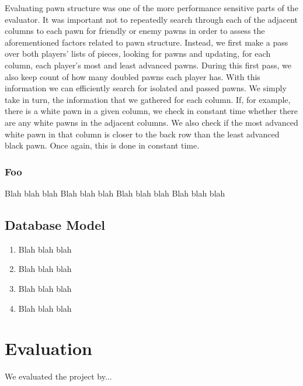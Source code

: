 \documentclass{l3proj}
\begin{document}
Evaluating pawn structure was one of the more performance sensitive parts of the evaluator. It was important not to repeatedly search through each of the adjacent columns to each pawn for friendly or enemy pawns in order to assess the aforementioned factors related to pawn structure. Instead, we first make a pass over both players’ lists of pieces, looking for pawns and updating, for each column, each player’s most and least advanced pawns. During this first pass, we also keep count of how many doubled pawns each player has. With this information we can efficiently search for isolated and passed pawns. We simply take in turn, the information that we gathered for each column. If, for example, there is a white pawn in a given column, we check in constant time whether there are any white pawns in the adjacent columns. We also check if the most advanced white pawn in that column is closer to the back row than the least advanced black pawn. Once again, this is done in constant time. \\

\subsection{Foo}

Blah blah blah
Blah blah blah
Blah blah blah
Blah blah blah

\section{Database Model}

\begin{enumerate}
\item Blah blah blah
\item Blah blah blah
\item Blah blah blah
\item Blah blah blah
\end{enumerate}



\chapter{Evaluation}

We evaluated the project by...

\end{document}
